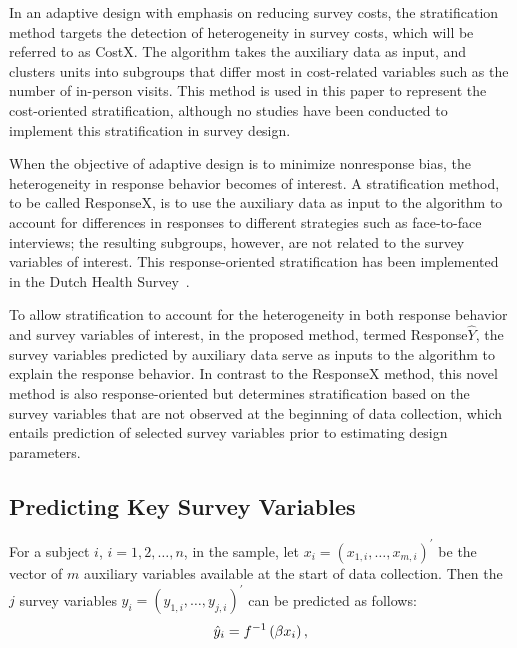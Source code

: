 \documentclass[12pt]{article}
\begin{document}
In an adaptive design with emphasis on reducing survey costs, the stratification method targets the detection of heterogeneity in survey costs, which will be referred to as CostX.
The algorithm takes the auxiliary data as input, and clusters units into subgroups that differ most in cost-related variables such as the number of in-person visits.
This method is used in this paper to represent the cost-oriented stratification, although no studies have been conducted to implement this stratification in survey design.

When the objective of adaptive design is to minimize nonresponse bias, the heterogeneity in response behavior becomes of interest.
A stratification method, to be called ResponseX, is to use the auxiliary data as input to the algorithm to account for differences in responses to different strategies such as face-to-face interviews; the resulting subgroups, however, are not related to the survey variables of interest.
This response-oriented stratification has been implemented in the Dutch Health Survey\unskip~\cite{Berkel:2020}.

To allow stratification to account for the heterogeneity in both response behavior and survey variables of interest, in the proposed method, termed Response$\hat{Y}$, the survey variables predicted by auxiliary data serve as inputs to the algorithm to explain the response behavior.
In contrast to the ResponseX method, this novel method is also response-oriented but determines stratification based on the survey variables that are not observed at the beginning of data collection, which entails prediction of selected survey variables prior to estimating design parameters.




\subsection{Predicting Key Survey Variables}
\label{subsec:predicting-key-survey-variables}

For a subject $i$, $i=1,2,\dots,n$, in the sample, let $x_{i}=(x_{1,i},\dots,x_{m,i})^{'}$ be the vector of $m$ auxiliary variables available at the start of data collection.
Then the $j$ survey variables $y_{i}=(y_{1,i},\dots,y_{j,i})^{'}$ can be predicted as follows:
\let\saveeqnno\theequation
\let\savefrac\frac
\def\dispfrac{\displaystyle\savefrac}
\begin{eqnarray}
\let\frac\dispfrac
\gdef\theequation{1}
\let\theHequation\theequation
\label{equation-predict-survey-variables}
	\hat{y}_i=f^{-1}\left(\beta x_{i} \right),
\end{eqnarray}
\global\let\theequation\saveeqnno
\addtocounter{equation}{-1}\ignorespaces
\end{document}
